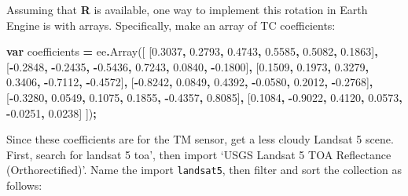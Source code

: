 \documentclass[
]{article}
\newenvironment{Shaded}{\begin{snugshade}}{\end{snugshade}}
\newcommand{\FloatTok}[1]{\textcolor[rgb]{0.00,0.00,0.81}{#1}}
\newcommand{\FunctionTok}[1]{\textcolor[rgb]{0.00,0.00,0.00}{#1}}
\newcommand{\KeywordTok}[1]{\textcolor[rgb]{0.13,0.29,0.53}{\textbf{#1}}}
\newcommand{\NormalTok}[1]{#1}
\newcommand{\OperatorTok}[1]{\textcolor[rgb]{0.81,0.36,0.00}{\textbf{#1}}}
\begin{document}
Assuming that \textbf{R} is available, one way to implement this rotation in Earth Engine is with arrays. Specifically, make an array of TC coefficients:

\begin{Shaded}
\begin{Highlighting}[]
\KeywordTok{var}\NormalTok{ coefficients }\OperatorTok{=}\NormalTok{ ee}\OperatorTok{.}\FunctionTok{Array}\NormalTok{([    }
\NormalTok{  [}\FloatTok{0.3037}\OperatorTok{,} \FloatTok{0.2793}\OperatorTok{,} \FloatTok{0.4743}\OperatorTok{,} \FloatTok{0.5585}\OperatorTok{,} \FloatTok{0.5082}\OperatorTok{,} \FloatTok{0.1863}\NormalTok{]}\OperatorTok{,}    
\NormalTok{  [}\OperatorTok{{-}}\FloatTok{0.2848}\OperatorTok{,} \OperatorTok{{-}}\FloatTok{0.2435}\OperatorTok{,} \OperatorTok{{-}}\FloatTok{0.5436}\OperatorTok{,} \FloatTok{0.7243}\OperatorTok{,} \FloatTok{0.0840}\OperatorTok{,} \OperatorTok{{-}}\FloatTok{0.1800}\NormalTok{]}\OperatorTok{,}
\NormalTok{  [}\FloatTok{0.1509}\OperatorTok{,} \FloatTok{0.1973}\OperatorTok{,} \FloatTok{0.3279}\OperatorTok{,} \FloatTok{0.3406}\OperatorTok{,} \OperatorTok{{-}}\FloatTok{0.7112}\OperatorTok{,} \OperatorTok{{-}}\FloatTok{0.4572}\NormalTok{]}\OperatorTok{,}
\NormalTok{  [}\OperatorTok{{-}}\FloatTok{0.8242}\OperatorTok{,} \FloatTok{0.0849}\OperatorTok{,} \FloatTok{0.4392}\OperatorTok{,} \OperatorTok{{-}}\FloatTok{0.0580}\OperatorTok{,} \FloatTok{0.2012}\OperatorTok{,} \OperatorTok{{-}}\FloatTok{0.2768}\NormalTok{]}\OperatorTok{,}
\NormalTok{  [}\OperatorTok{{-}}\FloatTok{0.3280}\OperatorTok{,} \FloatTok{0.0549}\OperatorTok{,} \FloatTok{0.1075}\OperatorTok{,} \FloatTok{0.1855}\OperatorTok{,} \OperatorTok{{-}}\FloatTok{0.4357}\OperatorTok{,} \FloatTok{0.8085}\NormalTok{]}\OperatorTok{,}
\NormalTok{  [}\FloatTok{0.1084}\OperatorTok{,} \OperatorTok{{-}}\FloatTok{0.9022}\OperatorTok{,} \FloatTok{0.4120}\OperatorTok{,} \FloatTok{0.0573}\OperatorTok{,} \OperatorTok{{-}}\FloatTok{0.0251}\OperatorTok{,} \FloatTok{0.0238}\NormalTok{]}
\NormalTok{])}\OperatorTok{;}  
\end{Highlighting}
\end{Shaded}

Since these coefficients are for the TM sensor, get a less cloudy Landsat 5 scene. First, search for landsat 5 toa', then import `USGS Landsat 5 TOA Reflectance (Orthorectified)'. Name the import \texttt{landsat5}, then filter and sort the collection as follows:
\end{document}
